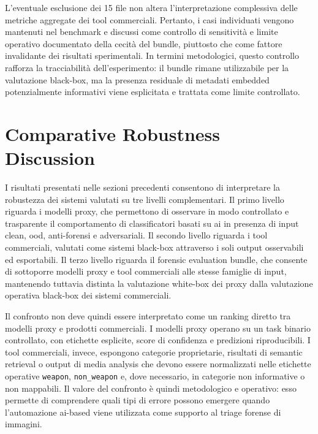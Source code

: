 L'eventuale esclusione dei 15 file non altera l'interpretazione complessiva delle
metriche aggregate dei tool commerciali. Pertanto, i casi individuati vengono
mantenuti nel benchmark e discussi come controllo di sensitività e limite
operativo documentato della cecità del bundle, piuttosto che come fattore
invalidante dei risultati sperimentali. In termini metodologici, questo controllo
rafforza la tracciabilità dell'esperimento: il bundle rimane utilizzabile per la
valutazione black-box, ma la presenza residuale di metadati embedded
potenzialmente informativi viene esplicitata e trattata come limite controllato.


\section{Comparative Robustness Discussion}
\label{sec:results-comparative}

I risultati presentati nelle sezioni precedenti consentono di interpretare la
robustezza dei sistemi valutati su tre livelli complementari. Il primo livello
riguarda i modelli proxy, che permettono di osservare in modo controllato e
trasparente il comportamento di classificatori basati su \gls{ai} in presenza di
input clean, \gls{ood}, anti-forensi e adversariali. Il secondo livello riguarda
i tool commerciali, valutati come sistemi black-box attraverso i soli output
osservabili ed esportabili. Il terzo livello riguarda il forensic evaluation
bundle, che consente di sottoporre modelli proxy e tool commerciali alle stesse
famiglie di input, mantenendo tuttavia distinta la valutazione white-box dei
proxy dalla valutazione operativa black-box dei sistemi commerciali.

Il confronto non deve quindi essere interpretato come un ranking diretto tra
modelli proxy e prodotti commerciali. I modelli proxy operano su un task binario
controllato, con etichette esplicite, score di confidenza e predizioni
riproducibili. I tool commerciali, invece, espongono categorie proprietarie,
risultati di semantic retrieval o output di media analysis che devono essere
normalizzati nelle etichette operative \texttt{weapon}, \texttt{non\_weapon} e,
dove necessario, in categorie non informative o non mappabili. Il valore del
confronto è quindi metodologico e operativo: esso permette di comprendere quali
tipi di errore possono emergere quando l'automazione \gls{ai}-based viene
utilizzata come supporto al triage forense di immagini.


